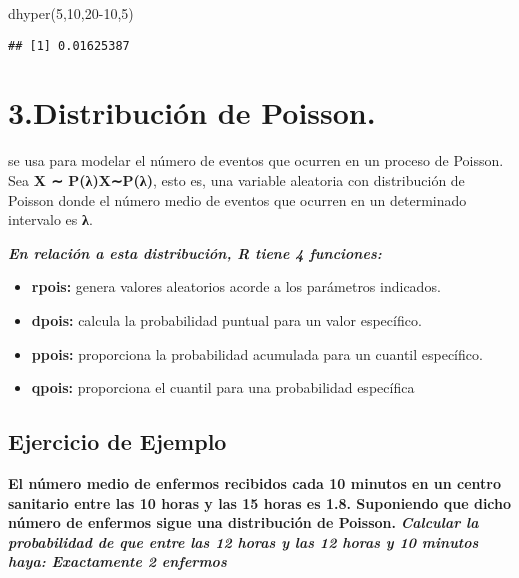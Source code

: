 \documentclass[
]{article}
\newenvironment{Shaded}{\begin{snugshade}}{\end{snugshade}}
\newcommand{\DecValTok}[1]{\textcolor[rgb]{0.00,0.00,0.81}{#1}}
\newcommand{\FunctionTok}[1]{\textcolor[rgb]{0.00,0.00,0.00}{#1}}
\newcommand{\NormalTok}[1]{#1}
\begin{document}
\begin{Shaded}
\begin{Highlighting}[]
\FunctionTok{dhyper}\NormalTok{(}\DecValTok{5}\NormalTok{,}\DecValTok{10}\NormalTok{,}\DecValTok{20{-}10}\NormalTok{,}\DecValTok{5}\NormalTok{)}
\end{Highlighting}
\end{Shaded}

\begin{verbatim}
## [1] 0.01625387
\end{verbatim}

\hypertarget{distribuciuxf3n-de-poisson.}{%
\section{3.Distribución de Poisson.}\label{distribuciuxf3n-de-poisson.}}

se usa para modelar el número de eventos que ocurren en un proceso de
Poisson. Sea \textbf{X ∼ P(λ)X∼P(λ)}, esto es, una variable aleatoria
con distribución de Poisson donde el número medio de eventos que ocurren
en un determinado intervalo es \textbf{λ}.

\textbf{\emph{En relación a esta distribución, R tiene 4 funciones:}}

\begin{itemize}
\item
  \textbf{rpois:} genera valores aleatorios acorde a los parámetros
  indicados.
\item
  \textbf{dpois:} calcula la probabilidad puntual para un valor
  específico.
\item
  \textbf{ppois:} proporciona la probabilidad acumulada para un cuantil
  específico.
\item
  \textbf{qpois:} proporciona el cuantil para una probabilidad
  específica
\end{itemize}

\hypertarget{ejercicio-de-ejemplo-1}{%
\subsection{Ejercicio de Ejemplo}\label{ejercicio-de-ejemplo-1}}

\textbf{El número medio de enfermos recibidos cada 10 minutos en un
centro sanitario entre las 10 horas y las 15 horas es 1.8. Suponiendo
que dicho número de enfermos sigue una distribución de Poisson.}
\textbf{\emph{Calcular la probabilidad de que entre las 12 horas y las
12 horas y 10 minutos haya: Exactamente 2 enfermos}}
\end{document}
